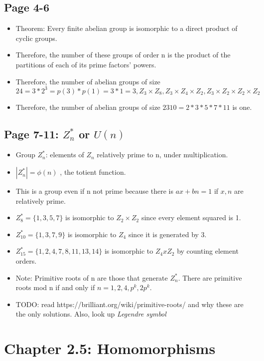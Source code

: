 \documentclass[11pt, oneside]{article}   	%
\begin{document}
\subsection{Page 4-6}
\begin{itemize}
\item Theorem: Every finite abelian group is isomorphic to a direct product of cyclic groups.
\item Therefore, the number of these groups of order n is the product of the partitions of each of its prime factors' powers.
\item Therefore, the number of abelian groups of size $24 = 3* 2^3 = p(3) * p(1) = 3 * 1 = 3, Z_3  \times Z_8, Z_3  \times Z_4 \times Z_2, Z_3  \times Z_2 \times Z_2 \times Z_2$
\item Therefore, the number of abelian groups of size $2310 = 2 * 3 *5 * 7 * 11$ is one.
\end{itemize}

\subsection{Page 7-11: $Z_n^*$ or $U(n)$}
\begin{itemize}
\item Group $Z_n^*$: elements of $Z_n$ relatively prime to n, under multiplication. 
\item $|Z_n^*| = \phi(n)$ , the totient function.
\item This is a group even if n not prime because there is $ax + bn = 1$  if $x, n$ are relatively prime.
\item $Z_8^* = \{1,3,5,7\}$ is isomorphic to $Z_2  \times Z_2$ since every element squared is 1.
\item $Z_10^* = \{1,3,7,9\}$ is isomorphic to $Z_4$ since it is generated by 3.
\item $Z_15^* = \{1,2,4,7,8,11,13,14\}$ is isomorphic to $Z_4 x Z_2$ by counting element orders.
\item Note: Primitive roots of n are those that generate $Z_n^*$.  There are primitive roots mod n if and only if $n = 1,2,4,p^k, 2p^k$.
\item TODO: read https://brilliant.org/wiki/primitive-roots/ and why these are the only solutions. Also, look up \emph{Legendre symbol}
\end{itemize}

\section {Chapter 2.5: Homomorphisms}
\end{document}
